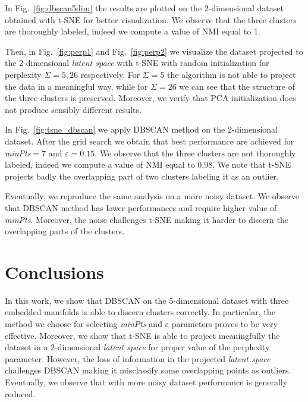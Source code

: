 \documentclass[prl,twocolumn]{revtex4-1}
\begin{document}
In Fig.~\ref{fig:dbscan5dim} the results are plotted on the 2-dimensional dataset obtained with t-SNE for better visualization. We observe that the three clusters are thoroughly labeled, indeed we compute a
value of NMI equal to 1.


Then, in Fig.~\ref{fig:perp1} and Fig.~\ref{fig:perp2} we visualize the dataset projected to the 2-dimensional \textit{latent space} with t-SNE with random initialization for perplexity \(\Sigma = 5, 26\) respectively. For \(\Sigma = 5\) the algorithm is not able to project the data in a meaningful way, while for \(\Sigma = 26\) we can see that the structure of the three clusters is preserved. Moreover, we verify that PCA initialization does not produce sensibly different results.

In Fig.~\ref{fig:tsne_dbscan} we apply DBSCAN method on the 2-dimensional dataset. After the grid search we obtain that best performance are achieved for \textit{minPts}\(=7\) and \(\varepsilon=0.15\). We observe that the three clusters are not thoroughly labeled, indeed we compute a value of NMI equal to 0.98. We note that t-SNE projects badly the overlapping part of two clusters labeling it as an outlier.

Eventually, we reproduce the same analysis on a more noisy dataset. We observe that DBSCAN method has lower performances and require higher value of \textit{minPts}. Moreover, the noise challenges t-SNE making it harder to discern the overlapping parts of the clusters.

\section{Conclusions}
In this  work, we show that DBSCAN on the 5-dimensional dataset with three embedded manifolds is able to discern clusters correctly. In particular, the method we choose for selecting \textit{minPts} and \(\varepsilon\) parameters proves to be very effective.
Moreover, we show that t-SNE is able to project meaningfully the dataset in a 2-dimensional \textit{latent space} for proper value of the perplexity parameter.
However, the loss of information in the projected \textit{latent space} challenges DBSCAN making it misclassify some overlapping points as outliers.
Eventually, we observe that with more noisy dataset performance is generally reduced.


\printbibliography
\end{document}
